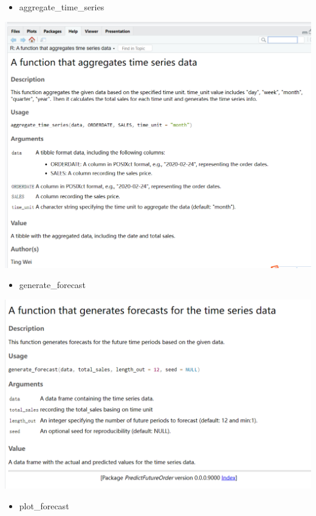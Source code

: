 \documentclass[
  11pt,
]{article}
\providecommand{\tightlist}{%
  \setlength{\itemsep}{0pt}\setlength{\parskip}{0pt}}\usepackage{longtable,booktabs,array}
\begin{document}
\begin{itemize}
\tightlist
\item
  aggregate\_time\_series
\end{itemize}

\includegraphics{img/aggregate_time_series.png}

\begin{itemize}
\tightlist
\item
  generate\_forecast
\end{itemize}

\includegraphics{img/generate_forecast.png}

\begin{itemize}
\tightlist
\item
  plot\_forecast
\end{itemize}
\end{document}

